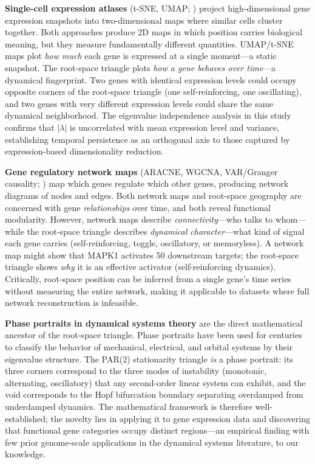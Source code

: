 \documentclass[11pt,letterpaper]{article}
\begin{document}
\textbf{Single-cell expression atlases} (t-SNE, UMAP; \citet{vandermaaten2008}) project high-dimensional gene expression snapshots into two-dimensional maps where similar cells cluster together. Both approaches produce 2D maps in which position carries biological meaning, but they measure fundamentally different quantities. UMAP/t-SNE maps plot \textit{how much} each gene is expressed at a single moment---a static snapshot. The root-space triangle plots \textit{how a gene behaves over time}---a dynamical fingerprint. Two genes with identical expression levels could occupy opposite corners of the root-space triangle (one self-reinforcing, one oscillating), and two genes with very different expression levels could share the same dynamical neighborhood. The eigenvalue independence analysis in this study confirms that $|\lambda|$ is uncorrelated with mean expression level and variance, establishing temporal persistence as an orthogonal axis to those captured by expression-based dimensionality reduction.

\textbf{Gene regulatory network maps} (ARACNE, WGCNA, VAR/Granger causality; \citet{fujita2007}) map which genes regulate which other genes, producing network diagrams of nodes and edges. Both network maps and root-space geography are concerned with gene \textit{relationships} over time, and both reveal functional modularity. However, network maps describe \textit{connectivity}---who talks to whom---while the root-space triangle describes \textit{dynamical character}---what kind of signal each gene carries (self-reinforcing, toggle, oscillatory, or memoryless). A network map might show that MAPK1 activates 50 downstream targets; the root-space triangle shows \textit{why} it is an effective activator (self-reinforcing dynamics). Critically, root-space position can be inferred from a single gene's time series without measuring the entire network, making it applicable to datasets where full network reconstruction is infeasible.

\textbf{Phase portraits in dynamical systems theory} are the direct mathematical ancestor of the root-space triangle. Phase portraits have been used for centuries to classify the behavior of mechanical, electrical, and orbital systems by their eigenvalue structure. The PAR(2) stationarity triangle \textit{is} a phase portrait: its three corners correspond to the three modes of instability (monotonic, alternating, oscillatory) that any second-order linear system can exhibit, and the void corresponds to the Hopf bifurcation boundary separating overdamped from underdamped dynamics. The mathematical framework is therefore well-established; the novelty lies in applying it to gene expression data and discovering that functional gene categories occupy distinct regions---an empirical finding with few prior genome-scale applications in the dynamical systems literature, to our knowledge.
\end{document}
